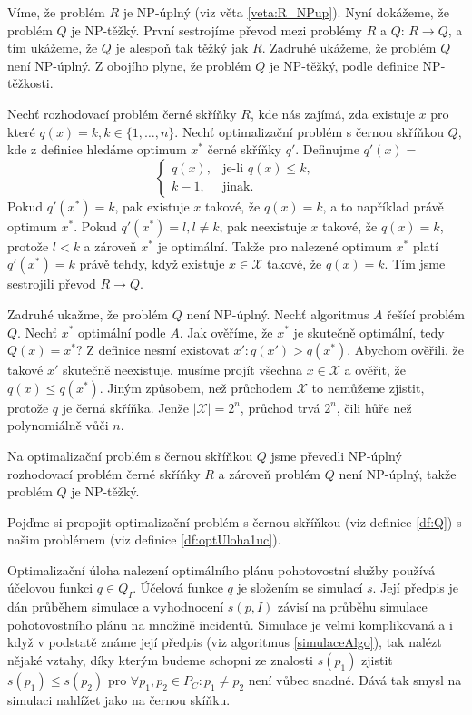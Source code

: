 \begin{dukaz}
  Víme, že problém $R$ je NP-úplný (viz věta \ref{veta:R_NPup}). Nyní dokážeme, že problém $Q$ je NP-těžký.
  První sestrojíme převod mezi problémy $R$ a $Q$: $R \rightarrow Q$, a tím ukážeme, že $Q$ je alespoň tak těžký jak $R$.
  Zadruhé ukážeme, že problém $Q$ není NP-úplný.
  Z obojího plyne, že problém $Q$ je NP-těžký, podle definice NP-těžkosti.

  Nechť rozhodovací problém černé skříňky $R$, kde nás zajímá, zda existuje $x$ pro které $q(x) = k, k \in \{ 1, \dots, n\}$. 
  Nechť optimalizační problém s černou skříňkou $Q$, kde z definice hledáme optimum $x^*$ černé skříňky $q'$.
  Definujme $q'(x) = $
  \[
  \begin{cases}
    q(x), & \text{je-li $q(x) \leq k$},\\
    k - 1, & \text{jinak}.
  \end{cases}
  \]
  Pokud $q'(x^*) = k$, pak existuje $x$ takové, že $q(x) = k$, a to například právě optimum $x^*$.
  Pokud $q'(x^*) = l, l \neq k$, pak neexistuje $x$ takové, že $q(x) = k$, protože $l < k$ a zároveň $x^*$ je optimální.
  Takže pro nalezené optimum $x^*$ platí $q'(x^*) = k$ právě tehdy, když existuje $x \in \mathcal{X}$ takové, že $q(x) = k$.
  Tím jsme sestrojili převod $R \rightarrow Q$.

  Zadruhé ukažme, že problém $Q$ není NP-úplný.
  Nechť algoritmus $A$ řešící problém $Q$.
  Nechť $x^*$ optimální podle $A$. Jak ověříme, že $x^*$ je skutečně optimální, tedy $Q(x) = x^*$?
  Z definice nesmí existovat $x' \colon q(x') > q(x^*)$.
  Abychom ověřili, že takové $x'$ skutečně neexistuje, musíme projít všechna $x \in \mathcal{X}$ a ověřit, že $q(x) \leq q(x^*)$.
  Jiným způsobem, než průchodem $\mathcal{X}$ to nemůžeme zjistit, protože $q$ je černá skříňka.
  Jenže $|\mathcal{X}| = 2^n$, průchod trvá $2^n$, čili hůře než polynomiálně vůči $n$.

  Na optimalizační problém s černou skříňkou $Q$ jsme převedli NP-úplný rozhodovací problém černé skříňky $R$ a zároveň
  problém $Q$ není NP-úplný, takže problém $Q$ je NP-těžký.
\end{dukaz}

Pojďme si propojit optimalizační problém s černou skříňkou (viz definice \ref{df:Q}) s našim problémem (viz definice \ref{df:optUloha1uc}). 

Optimalizační úloha nalezení optimálního plánu pohotovostní služby používá účelovou funkci $q \in Q_I$.
Účelová funkce $q$ je složením se simulací $s$.
Její předpis je dán průběhem simulace a vyhodnocení $s(p, I)$ závisí na průběhu simulace pohotovostního plánu na množině incidentů.
Simulace je velmi komplikovaná a i když v podstatě známe její předpis (viz algoritmus \ref{simulaceAlgo}),
tak nalézt nějaké vztahy, díky kterým budeme schopni ze znalosti $s(p_1)$ zjistit $s(p_1) \leq s(p_2)$ pro $\forall p_1, p_2 \in P_C \colon p_1 \neq p_2$ není vůbec snadné.
Dává tak smysl na simulaci nahlížet jako na černou skíňku.

